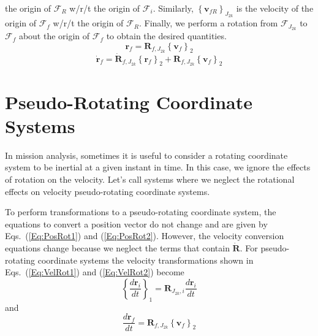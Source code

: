 the origin of $\mathcal{F}_R$ w/r/t the origin of $\mathcal{F}_i$.
Similarly, $\left\{\mathbf{v}_{fR}\right\}_{J_{2k}}$ is the
velocity of the origin of $\mathcal{F}_f$ w/r/t the origin of
$\mathcal{F}_R$. Finally, we perform a rotation from
$\mathcal{F}_{J_{2k}}$ to $\mathcal{F}_f$ about the origin of
$\mathcal{F}_f$ to obtain the desired quantities.
%
\begin{equation}
    \mathbf{r}_f = \mathbf{R}_{f,J_{2k}}
    \left\{\mathbf{v}_f\right\}_{2} \label{Eq:PosRot2}
\end{equation}
%
\begin{equation}
  \dot{\mathbf{r}}_f = \dot{\mathbf{R}}_{f,J_{2k}}\left\{\mathbf{r}_f\right\}_{2} + \mathbf{R}_{f,J_{2k}}\left\{\mathbf{v}_f\right\}_{2}
   \label{Eq:VelRot2}
 \end{equation}
%
%


\section{Pseudo-Rotating Coordinate\\ Systems} \label{Sec:PseudoRotating}

In mission analysis, sometimes it is useful to consider a rotating
coordinate system to be inertial at a given instant in time. In this
case, we ignore the effects of rotation on the velocity.  Let's call
systems where we neglect the rotational effects on velocity
 pseudo-rotating coordinate systems.

To perform transformations to a pseudo-rotating coordinate system,
the equations to convert a  position vector do not change and are
given by Eqs.~(\ref{Eq:PosRot1}) and (\ref{Eq:PosRot2}).  However,
the velocity conversion equations change because we neglect the
terms that contain $\dot{\mathbf{R}}$.  For pseudo-rotating
coordinate systems the velocity transformations shown in
Eqs.~(\ref{Eq:VelRot1}) and (\ref{Eq:VelRot2}) become
%
\begin{equation}
          \left\{\frac{d\mathbf{r}_i}{dt}\right\}_1 =  \mathbf{R}_{J_{2k},i}\frac{d\mathbf{r}_{i}}{dt}
\end{equation}
%
and
%
\begin{equation}
  \frac{d\mathbf{r}_f}{dt} =  \mathbf{R}_{f,J_{2k}}\left\{\mathbf{v}_f\right\}_{2}
\end{equation}
%

